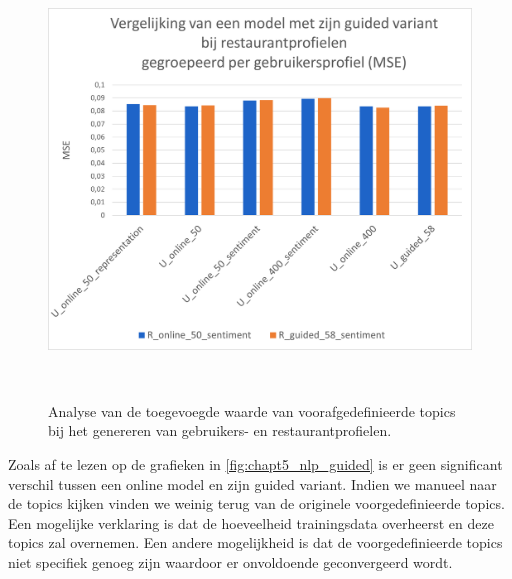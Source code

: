 \begin{figure}[H]
        \centering
        \parbox[b]{0.6\textwidth}{\includegraphics[width=\linewidth]{fig/chapt5/NLP/nlp_comparison_guided_restaurant.png}}\quad
        \parbox[b]{0.37\textwidth}{
        \label{fig:chapt5_nlp_guided_restaurant}}
        \\[.5cm]

        \caption{Analyse van de toegevoegde waarde van voorafgedefinieerde topics bij het genereren van gebruikers- en restaurantprofielen.}
        \label{fig:chapt5_nlp_guided}
\end{figure}

Zoals af te lezen op de grafieken in \autoref{fig:chapt5_nlp_guided} is er geen significant verschil tussen een online model en zijn guided variant. Indien we manueel naar de topics kijken vinden we weinig terug van de originele voorgedefinieerde topics. Een mogelijke verklaring is dat de hoeveelheid trainingsdata overheerst en deze topics zal overnemen. Een andere mogelijkheid is dat de voorgedefinieerde topics niet specifiek genoeg zijn waardoor er onvoldoende geconvergeerd wordt. \\

